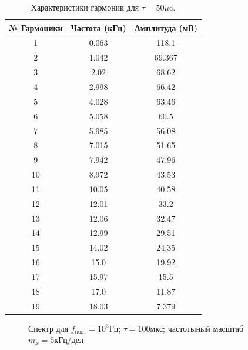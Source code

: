 \documentclass[a4paper,12pt]{article} %
\begin{document}
\begin{table}[H]
\caption{\label{tab2} Характеристики гармоник для $\tau = 50 \mu \text{c}$.}
\begin{center}
\begin{tabular}{|c|c|c|}
\hline
№ Гармоники & Частота (кГц) & Амплитуда (мВ)\\
\hline
1 & 0.063 & 118.1\\
\hline
2 & 1.042 & 69.367\\
\hline
3 & 2.02 & 68.62\\
\hline
4 & 2.998 & 66.42\\
\hline
5 & 4.028 & 63.46\\
\hline
6 & 5.058 & 60.5\\
\hline
7 & 5.985 & 56.08\\
\hline
8 & 7.015 & 51.65\\
\hline
9 & 7.942 & 47.96\\
\hline
10 & 8.972 & 43.53\\
\hline
11 & 10.05 & 40.58\\
\hline
12 & 12.01 & 33.2\\
\hline
13 & 12.06 & 32.47\\
\hline
14 & 12.99 & 29.51\\
\hline
15 & 14.02 & 24.35\\
\hline
16 & 15.0 & 19.92\\
\hline
17 & 15.97 & 15.5\\
\hline
18 & 17.0 & 11.87\\
\hline
19 & 18.03 & 7.379\\
\hline
\end{tabular}
\end{center}
\label{table1:ref}
\end{table}

\begin{figure}[H]\label{pic6}
 	\caption{Спектр для $f_\text{повт} = 10^3\text{Гц}$; $\tau = 100 \text{мкс}$; частотыный масштаб $m_x = 5 \text{кГц/дел}$}
\end{figure}
\end{document}
